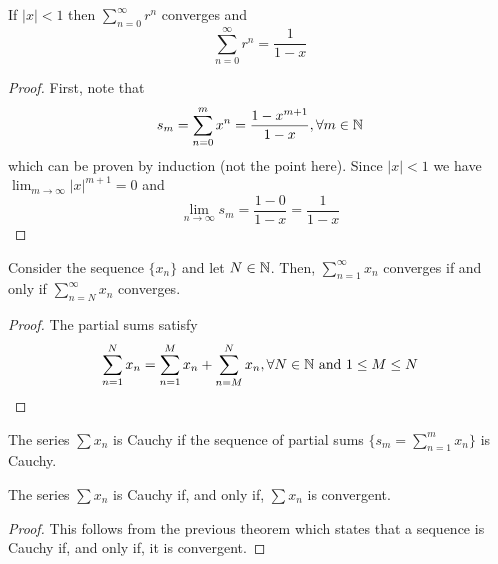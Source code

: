 \begin{theorem}
    If $|x| < 1$ then $\sum _{n=0}^\infty r^n$ converges and
    \begin{equation}
        \sum \limits_{n=0}^\infty r^n = \frac{1}{1-x}
    \end{equation}
\end{theorem}

\begin{proof}
    First, note that
    \begin{equation*}
        s_m = \sum \limits_{n=0}^m x^n = \frac{1-x^{m+1}}{1-x}, \forall m \in \mathbb{N}
    \end{equation*}
    which can be proven by induction (not the point here). Since $|x| < 1$ we have $\lim_{m\to \infty} |x|^{m+1} = 0$ and
    \begin{equation*}
        \lim \limits_{n \to \infty} s_m = \frac{1-0}{1-x} = \frac{1}{1-x}
    \end{equation*}
\end{proof}

\begin{theorem}
    Consider the sequence $\{x_n\}$ and let $N \in \mathbb{N}$. Then, $\sum_{n=1}^\infty x_n$ converges if and only if $\sum_{n=N}^\infty x_n$ converges.
\end{theorem}

\begin{proof}
    The partial sums satisfy
    \begin{equation*}
        \sum \limits_{n=1}^N x_n = \sum \limits_{n=1}^M x_n + \sum \limits_{n=M}^N x_n, \forall  N \in \mathbb{N} \textnormal{ and } 1 \leq M \leq N
    \end{equation*}
\end{proof}

\begin{definition}
    The series $\sum x_n$ is Cauchy if the sequence of partial sums $\{s_m = \sum_{n=1}^m x_n\}$ is Cauchy.
\end{definition}

\begin{theorem}
    The series $\sum x_n$ is Cauchy if, and only if, $\sum x_n$ is convergent.
\end{theorem}

\begin{proof}
    This follows from the previous theorem which states that a sequence is Cauchy if, and only if, it is convergent.
\end{proof}

